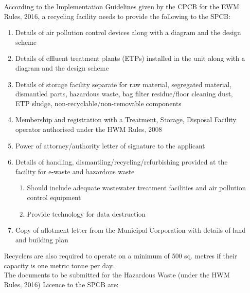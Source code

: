 \documentclass[a4paper, 12pt]{article}
\begin{document}
        According to the Implementation Guidelines given by the CPCB for the EWM Rules, 2016, a recycling facility needs to provide the following to the SPCB:
            \begin{enumerate}
            
                       \item Details of air pollution control devices along with a diagram and the design scheme
                        \item Details of effluent treatment plants (ETPs) installed in the unit along with a diagram and the design scheme 
                        \item Details of storage facility separate for raw material, segregated material, dismantled parts, hazardous waste, bag filter residue/floor cleaning dust, ETP sludge, non-recyclable/non-removable components
                             \item Membership and registration with a Treatment, Storage, Disposal Facility operator authorised under the HWM Rules, 2008
                              \item Power of attorney/authority letter of signature to the applicant
                               \item Details of handling, dismantling/recycling/refurbishing provided at the facility for e-waste and hazardous waste		                  
                               \begin{enumerate}
                          	 	\item Should include adequate wastewater treatment facilities and air pollution control equipment 
                    	 		 \item Provide technology for data destruction 
                      		 \end{enumerate}
                       \item Copy of allotment letter from the Municipal Corporation with details of land and building plan \\
            \end{enumerate}
            
            Recyclers are also required to operate on a minimum of 500 sq. metres if their capacity is one metric tonne per day.\\
            
            The documents to be submitted for the Hazardous Waste (under the HWM Rules, 2016) Licence to the SPCB are:
        
\end{document}
